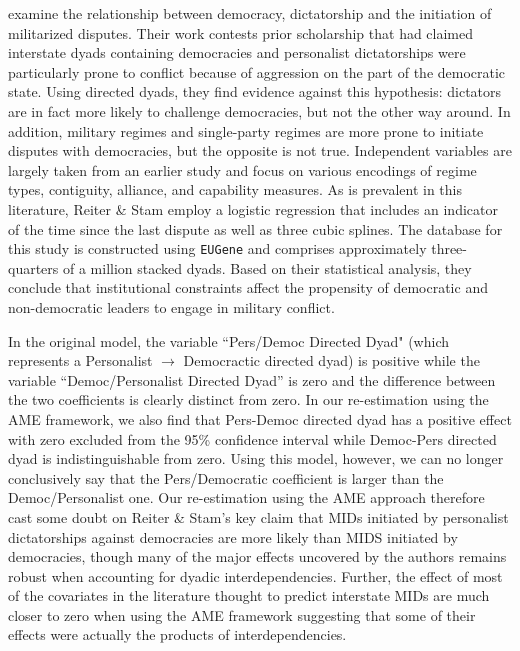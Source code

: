 \documentclass{article}[12pt]
\begin{document}
\citet{reiter:stam:2003} examine the relationship between democracy, dictatorship and the initiation of militarized disputes. Their work contests prior scholarship that had claimed interstate dyads containing democracies and personalist dictatorships were particularly prone to conflict because of aggression on the part of the democratic state. Using directed dyads, they find evidence against this hypothesis: dictators are in fact more likely to challenge democracies, but not the other way around.  In addition, military regimes and single-party regimes are more prone to initiate disputes with democracies, but the opposite is not true. Independent variables are largely taken from an earlier study and focus on various encodings of regime types, contiguity, alliance, and capability measures. As is prevalent in this literature, Reiter \& Stam employ a logistic regression that includes an indicator of the time since the last dispute as well as three cubic splines. The database for this study is constructed using \texttt{EUGene} \citep{bennett:stam:2000} and comprises approximately three-quarters of a million stacked dyads. Based on their statistical analysis, they conclude that institutional constraints affect the propensity of democratic and non-democratic leaders to engage in military conflict. 

In the original model, the variable ``Pers/Democ Directed Dyad" (which represents a Personalist $\rightarrow$ Democractic directed dyad) is positive while the variable ``Democ/Personalist Directed Dyad'' is zero and the difference between the two coefficients is clearly distinct from zero. In our re-estimation using the AME framework, we also find that Pers-Democ directed dyad has a positive effect with zero excluded from the 95\% confidence interval while Democ-Pers directed dyad is indistinguishable from zero. Using this model, however, we can no longer conclusively say that the Pers/Democratic coefficient is larger than the Democ/Personalist one. Our re-estimation using the AME approach therefore cast some doubt on Reiter \& Stam's key claim that MIDs initiated by personalist dictatorships against democracies are more likely than MIDS initiated by democracies, though many of the major effects  uncovered by the authors remains robust when accounting for dyadic interdependencies. Further, the effect of most of the covariates in the literature thought to predict interstate MIDs are much closer to zero when using the AME framework suggesting that some of their effects were actually the products of interdependencies. 
\end{document}
